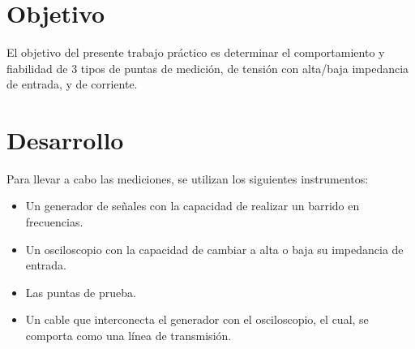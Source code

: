 \documentclass[a4paper,10pt]{article}
\title{  }
\begin{document}
	\maketitle %
	\newpage

	\tableofcontents %
	\newpage


	\section{Objetivo}
	
	\indent	El objetivo del presente trabajo práctico es determinar el comportamiento y fiabilidad de 3 tipos de puntas de medición, de tensión con alta/baja impedancia de entrada, y de corriente.
	
	\newpage
	\section{Desarrollo}
		\indent Para llevar a cabo las mediciones, se utilizan los siguientes instrumentos:
		\begin{itemize}
			\item Un generador de señales con la capacidad de realizar un barrido en frecuencias.
			\item Un osciloscopio con la capacidad de cambiar a alta o baja su impedancia de entrada.
			\item Las puntas de prueba.
			\item Un cable que interconecta el generador con el osciloscopio, el cual, se comporta como una línea de transmisión.
		\end{itemize}
				 
\end{document}
